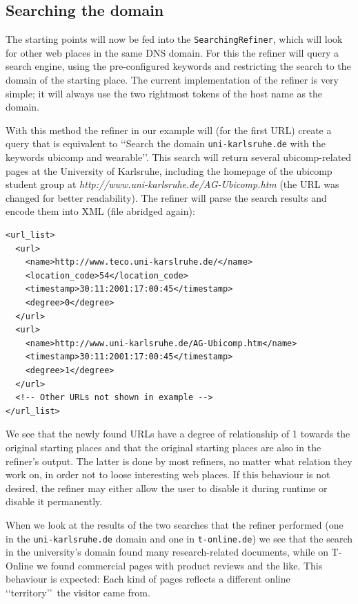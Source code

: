 \documentclass[a4paper]{danarticle}
\theoremstyle{remark}
\begin{document}
    \subsection{Searching the domain}
      The starting points will now be fed into the \verb$SearchingRefiner$,
      which will look for other web places in the same DNS domain. For this the
      refiner will query a search engine, using the pre-configured keywords and
      restricting the search to the domain of the starting place. The current
      implementation of the refiner is very simple; it will always use the two
      rightmost tokens of the host name as the domain. 
      
      With this method the refiner in our example will (for the first URL)
      create a query that is equivalent to \lq\lq Search the domain
      \verb$uni-karlsruhe.de$ with the keywords ubicomp and wearable\rq\rq .
      This search will return several ubicomp-related pages at the University of
      Karlsruhe, including the homepage of the ubicomp student group at 
      \textit{http://www.uni-karlsruhe.de/AG-Ubicomp.htm} (the URL
      was changed for better readability). The refiner will parse the search
      results and encode them into XML (file abridged again):
      \begin{verbatim}
<url_list>
  <url> 
    <name>http://www.teco.uni-karslruhe.de/</name> 
    <location_code>54</location_code> 
    <timestamp>30:11:2001:17:00:45</timestamp> 
    <degree>0</degree> 
  </url> 
  <url>
    <name>http://www.uni-karlsruhe.de/AG-Ubicomp.htm</name> 
    <timestamp>30:11:2001:17:00:45</timestamp> 
    <degree>1</degree> 
  </url>
  <!-- Other URLs not shown in example --> 
</url_list>
      \end{verbatim}
      We see that the newly found URLs have a degree of relationship of 1
      towards the original starting places and that the original starting places
      are also in the refiner's output. The latter is done by most refiners, no
      matter what relation they work on, in order not to loose interesting web
      places. If this behaviour is not desired, the refiner may either allow the
      user to disable it during runtime or disable it permanently.
      
      When we look at the results of the two searches that the refiner performed
      (one in the \verb$uni-karlsruhe.de$ domain and one in \verb$t-online.de$)
      we see that the search in the university's domain found many
      research-related documents, while on T-Online we found commercial pages
      with product reviews and the like. This behaviour is expected: Each kind
      of pages reflects a different online \lq\lq territory\rq\rq\ the visitor
      came from.
\end{document}
